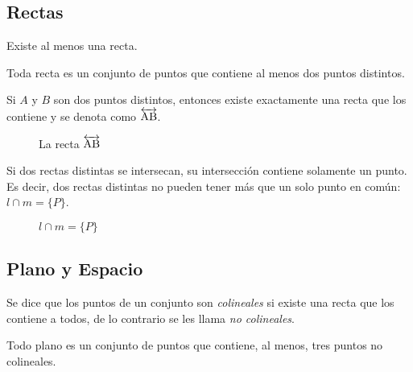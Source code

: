 \subsection{Rectas}

\begin{postulate}
    Existe al menos una recta.
\end{postulate}

\begin{postulate}
    Toda recta es un conjunto de puntos que contiene al menos dos puntos distintos.
\end{postulate}

\begin{postulate}
    Si $A$ y $B$ son dos puntos distintos, entonces existe exactamente una recta que los contiene y se denota como $\overleftrightarrow{\rm AB}$.
    
    \begin{figure}[h]
        \centering
        
        \caption{La recta $\overleftrightarrow{\rm AB}$}
        \label{fig:plot3}
    \end{figure}
\end{postulate}

\begin{theorem}

Si dos rectas distintas se intersecan, su intersección contiene solamente un punto. Es decir, dos rectas distintas no pueden tener más que un solo punto en común: $l \cap m = \{P\}$.

    \begin{figure}[!h]
        \centering
        
        \caption{$l \cap m = \{P\}$}
        \label{fig:plot19}
    \end{figure}
    
\end{theorem}

\subsection{Plano y Espacio}

\begin{definition}
    Se dice que los puntos de un conjunto son \textit{colineales} si existe una recta que los contiene a todos, de lo contrario se les llama \textit{no colineales}.
\end{definition}

\begin{postulate}
    Todo plano es un conjunto de puntos que contiene, al menos, tres puntos no colineales.
\end{postulate}

